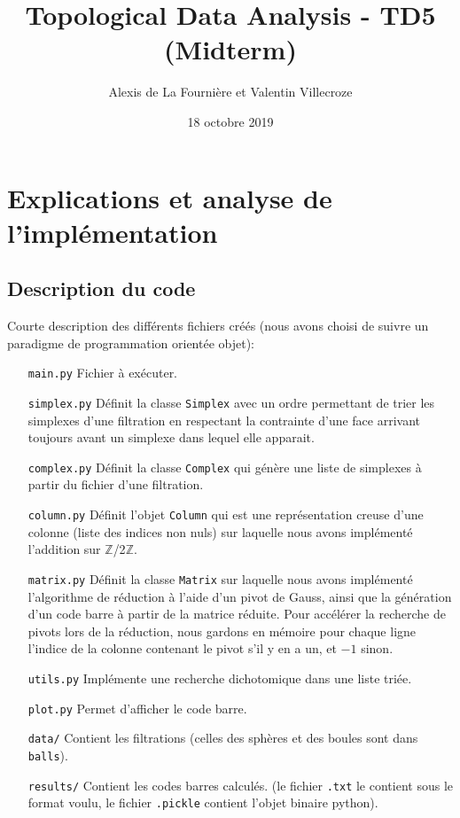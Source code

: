 \documentclass[french, a4paper, 12pt]{article}
\begin{document}
\title{Topological Data Analysis - TD5 (Midterm)}
\author{Alexis de La Fournière et Valentin Villecroze}
\date{18 octobre 2019}
\maketitle


\section{Explications et analyse de l'implémentation}

\subsection{Description du code}
Courte description des différents fichiers créés (nous avons choisi 
de suivre un paradigme de programmation orientée objet):
\vskip 0.5cm
\begin{itemize}
    \item[\texttt{main.py}] Fichier à exécuter.
    \item[\texttt{simplex.py}] Définit la classe \texttt{Simplex} 
    avec un ordre permettant de trier les simplexes d'une filtration
    en respectant la contrainte d'une face arrivant toujours avant
    un simplexe dans lequel elle apparait. 
    \item[\texttt{complex.py}] Définit la classe \texttt{Complex} qui 
    génère une liste de simplexes à partir du fichier d'une filtration. 
    \item[\texttt{column.py}] Définit l'objet \texttt{Column} qui
    est une représentation creuse d'une colonne (liste des
    indices non nuls) sur laquelle nous avons implémenté l'addition
    sur $\mathbb{Z}$/2$\mathbb{Z}$. 
    \item[\texttt{matrix.py}] Définit la classe \texttt{Matrix} sur
    laquelle nous avons implémenté l'algorithme de réduction à l'aide
    d'un pivot de Gauss, ainsi que la génération d'un code barre à
    partir de la matrice réduite. Pour accélérer la recherche de 
    pivots lors de la réduction, nous gardons en mémoire pour
    chaque ligne l'indice de la colonne contenant le pivot s'il y
    en a un, et $-1$ sinon.
    \item[\texttt{utils.py}] Implémente une recherche dichotomique
    dans une liste triée. 
    \item[\texttt{plot.py}] Permet d'afficher le code barre. 
    \vskip 0.5cm
    \item[\texttt{data/}] Contient les filtrations (celles des 
    sphères et des boules sont dans \texttt{balls}).
    \item[\texttt{results/}] Contient les codes barres calculés.
    (le fichier \texttt{.txt} le contient sous le format voulu, le
    fichier \texttt{.pickle} contient l'objet binaire python). 
\end{itemize}
\end{document}
